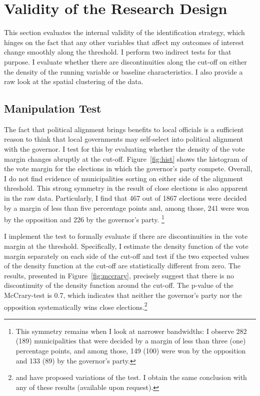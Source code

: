 \documentclass[dv_diss_main.tex]{subfiles}
\begin{document}
\section{Validity of the Research Design}\label{sec:ValResDes}

This section evaluates the internal validity of the identification strategy, which hinges on the fact that any other variables that affect my outcomes of interest change smoothly along the threshold. I perform two indirect tests for that purpose. I evaluate whether there are discontinuities along the cut-off on either the density of the running variable or baseline characteristics. I also provide a raw look at the spatial clustering of the data.

\subsection{Manipulation Test} The fact that political alignment brings benefits to local officials is a sufficient reason to think that local governments may self-select into political alignment with the governor. I test for this by evaluating whether the density of the vote margin changes abruptly at the cut-off. Figure~\ref{fig:hist} shows the histogram of the vote margin for the elections in which the governor's party compete. Overall, I do not find evidence of municipalities sorting on either side of the alignment threshold. This strong symmetry in the result of close elections is also apparent in the raw data. Particularly, I find that 467 out of 1867 elections were decided by a margin of less than five percentage points and, among those, 241 were won by the opposition and 226 by the governor's party. \footnote{This symmetry remains when I look at narrower bandwidths: I observe 282 (189) municipalities that were decided by a margin of less than three (one) percentage points, and among those, 149 (100) were won by the opposition and 133 (89) by the governor's party.} 

I implement the \cite{mccrary2008manipulation} test to formally evaluate if there are discontinuities in the vote margin at the threshold. Specifically, I estimate the density function of the vote margin separately on each side of the cut-off and test if the two expected values of the density function at the cut-off are statistically different from zero. The results, presented in Figure~\ref{fig:mccrary}, precisely suggest that there is no discontinuity of the density function around the cut-off. The p-value of the McCrary-test is 0.7, which indicates that neither the governor's party nor the opposition systematically wins close elections.\footnote{ \cite{calonico2020optimal} and \cite{bugni2021testing} have proposed variations of the \cite{mccrary2008manipulation} test. I obtain the same conclusion with any of these results (available upon request).}  
\end{document}
